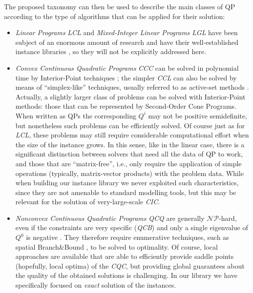 The proposed taxonomy can then be used to describe the main classes of QP according to the type of algorithms that can be applied for their solution:
%
\begin{itemize}
 \item \emph{Linear Programs} \textit{LCL} and \emph{Mixed-Integer Linear Programs} \textit{LGL} have been subject of an enormous amount of research and have their well-established instance libraries \cite{Koch2011}, so they will not be explicitly addressed here.
 \item \emph{Convex Continuous Quadratic Programs} \textit{CCC} can be solved in polynomial time by Interior-Point techniques \cite{Wright97}; the simpler \textit{CCL} can also be solved by means of ``simplex-like'' techniques, usually referred to as active-set methods \cite{Dost09}. Actually, a slightly larger class of problems can be solved with Interior-Point methods: those that can be represented by Second-Order Cone Programs. When written as QPs the corresponding $Q^i$ may not be positive semidefinite, but nonetheless such problems can be efficiently solved. Of course just as for \textit{LCL}, these problems may still require considerable computational effort when the size of the instance grows. In this sense, like in the linear case, there is a significant distinction between solvers that need all the data of QP to work, and those that are ``matrix-free'', i.e., only require the application of simple operations (typically, matrix-vector products) with the problem data. While when building our instance library we never exploited such characteristics, since they are not amenable to standard modelling tools, but this may be relevant for the solution of very-large-scale \textit{CIC}.
 \item \emph{Nonconvex Continuous Quadratic Programs} \textit{QCQ} are generally $\mathcal{NP}$-hard, even if the constraints are very specific (\textit{QCB}) and only a single eigenvalue of $Q^0$ is negative \cite{Hemmecke2010}. They therefore require enumerative techniques, such as spatial Branch\&Bound \cite{FV90,BeLeLiMaWa08}, to be solved to optimality. Of course, local approaches are available that are able to efficiently provide saddle points (hopefully, local optima) of the \textit{CQC}, but providing global guarantees about the quality of the obtained solutions is challenging. In our library we have specifically focused on  \emph{exact} solution of the instances.

\end{itemize}
